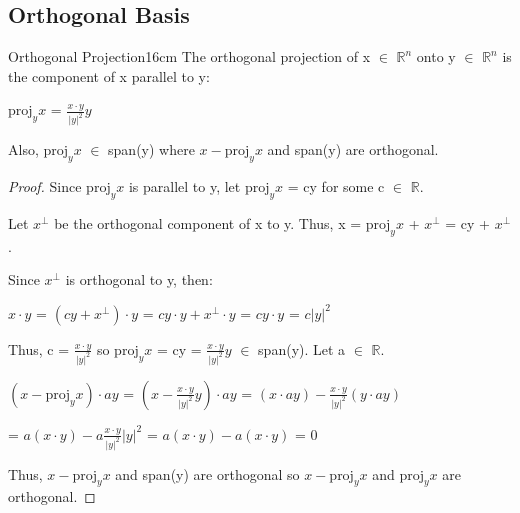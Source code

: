     \vspace{0.5cm}





\subsection{ Orthogonal Basis }

    \begin{wtheorem}{Orthogonal Projection}{16cm}
        The {\color{lblue} orthogonal projection} of x $\in$ $\mathbb{R}^n$ onto
        y $\in$ $\mathbb{R}^n$ is the component of x parallel to y:

        \hspace{0.5cm}
        $\text{proj}_yx$ = $\frac{x \cdot y}{|y|^2}y$

        Also, $\text{proj}_yx$ $\in$ span(y)
        where $x - \text{proj}_yx$ and span(y) are orthogonal.
    \end{wtheorem}

    \begin{proof}
        Since $\text{proj}_yx$ is parallel to y, let
        $\text{proj}_yx$ = cy for some c $\in$ $\mathbb{R}$.

        Let $x^{\perp}$ be the orthogonal component of x to y.
        Thus, x = $\text{proj}_yx$ + $x^{\perp}$ = cy + $x^{\perp}$.

        Since $x^{\perp}$ is orthogonal to y, then:

        \hspace{0.5cm}
        $x \cdot y$
        = $(cy + x^{\perp}) \cdot y$
        = $cy \cdot y + x^{\perp} \cdot y$
        = $c y \cdot y$
        = $c|y|^2$

        Thus, c = $\frac{x \cdot y}{|y|^2}$
        so $\text{proj}_yx$ = cy = $\frac{x \cdot y}{|y|^2}y$
        $\in$ span(y).
        Let a $\in$ $\mathbb{R}$.

        \hspace{0.5cm}
        $(x - \text{proj}_yx) \cdot ay$
        = $(x - \frac{x \cdot y}{|y|^2}y) \cdot ay$
        = $(x \cdot ay) - \frac{x \cdot y}{|y|^2}(y \cdot ay)$

        \hspace{3.6cm}
        = $a(x \cdot y) - a\frac{x \cdot y}{|y|^2}|y|^2$
        = $a(x \cdot y) - a(x \cdot y)$
        = 0

        Thus, $x - \text{proj}_yx$ and span(y) are orthogonal
        so $x - \text{proj}_yx$ and $\text{proj}_yx$ are orthogonal.
    \end{proof}

